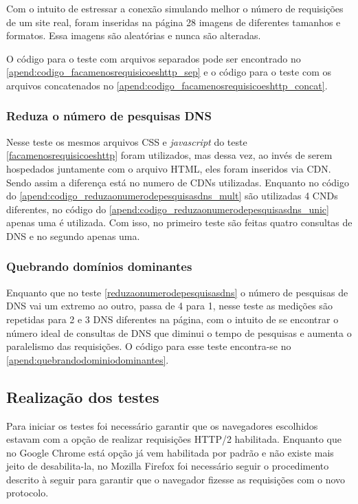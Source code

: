 Com o intuito de estressar a conexão simulando melhor o número de requisições de um site real, foram inseridas na página 28 imagens de diferentes tamanhos e formatos. Essa imagens são aleatórias e nunca são alteradas.

O código para o teste com arquivos separados pode ser encontrado no \autoref{apend:codigo_facamenosrequisicoeshttp_sep} e o código para o teste com os arquivos concatenados no \autoref{apend:codigo_facamenosrequisicoeshttp_concat}.

\subsubsection{Reduza o número de pesquisas DNS}
\label{reduzaonumerodepesquisasdns}

Nesse teste os mesmos arquivos CSS e \textit{javascript} do teste \ref{facamenosrequisicoeshttp} foram utilizados, mas dessa vez, ao invés de serem hospedados juntamente com o arquivo HTML, eles foram inseridos via CDN. Sendo assim a diferença está no numero de CDNs utilizadas. Enquanto no código do \autoref{apend:codigo_reduzaonumerodepesquisasdns_mult} são utilizadas 4 CNDs diferentes, no código do \autoref{apend:codigo_reduzaonumerodepesquisasdns_unic} apenas uma é utilizada. Com isso, no primeiro teste são feitas quatro consultas de DNS e no segundo apenas uma.

\subsubsection{Quebrando domínios dominantes}
\label{quebrandodominiosdominantes}

Enquanto que no teste \autoref{reduzaonumerodepesquisasdns} o número de pesquisas de DNS vai um extremo ao outro, passa de 4 para 1, nesse teste as medições são repetidas para 2 e 3 DNS diferentes na página, com o intuito de se encontrar o número ideal de consultas de DNS que diminui o tempo de pesquisas e aumenta o paralelismo das requisições. O código para esse teste encontra-se no \autoref{apend:quebrandodominiodominantes}.

\subsection{Realização dos testes}
\label{realizacaodostestes}

Para iniciar os testes foi necessário garantir que os navegadores escolhidos estavam com a opção de realizar requisições HTTP/2 habilitada. Enquanto que no Google Chrome está opção já vem habilitada por padrão e não existe mais jeito de desabilita-la, no Mozilla Firefox foi necessário seguir o procedimento descrito à seguir para garantir que o navegador fizesse as requisições com o novo protocolo.


